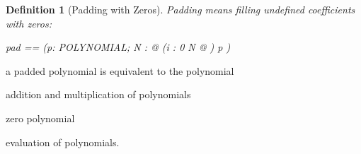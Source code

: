 \documentclass[12pt]{scrartcl}
\newtheorem{zdef}{Definition}[section]
\begin{document}
\begin{zdef}[Padding with Zeros]
  \label{zdef:padding-zeros}
  Padding means filling undefined coefficients with zeros:
  \begin{zed}
    pad == (\lambda p: POLYNOMIAL; N : \nat @ (\lambda i : 0 \upto N @
    \azero) \oplus p )
  \end{zed}
\end{zdef}

a padded polynomial is equivalent to the polynomial

addition and multiplication of polynomials

zero polynomial

evaluation of polynomials.

% 
\printbibliography{}

\end{document}
